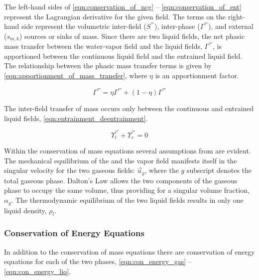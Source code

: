 The left-hand sides of \eqref{eqn:conservation_of_ncg} -- \eqref{eqn:conservation_of_ent} represent the Lagrangian derivative for the given field.
The terms on the right-hand side represent the volumetric inter-field ($S^{'''}$), inter-phase ($\Gamma^{'''}$),  and external ($s_{m,k}$) sources or sinks of mass.
Since there are two liquid fields, the net phasic mass transfer between the water-vapor field and the liquid fields, $\Gamma^{'''}$, is apportioned between the continuous liquid field and the entrained liquid field.
The relationship between the phasic mass transfer terms is given by \eqref{eqn:apportionment_of_mass_transfer}, where $\eta$ is an apportionment factor. 

\begin{equation}
\label{eqn:apportionment_of_mass_transfer}
\Gamma^{'''} = \eta \Gamma^{'''} + (1 - \eta)\Gamma^{'''}
\end{equation}

The inter-field transfer of mass occurs only between the continuous and entrained liquid fields, \eqref{eqn:entrainment_deentrainment}.

\begin{equation}
\label{eqn:entrainment_deentrainment}
\Upsilon^{'''}_l + \Upsilon^{'''}_e = 0
\end{equation}

Within the conservation of mass equations several assumptions from  are evident.
The mechanical equilibrium of the \ncg{} and the vapor field manifests itself in the singular velocity for the two gaseous fields: $\vec{u}_g$, where the $g$ subscript denotes the total gaseous phase.
Dalton's Law allows the two components of the gaseous phase to occupy the same volume, thus providing for a singular volume fraction, $\alpha_g$.
The thermodynamic equilibrium of the two liquid fields results in only one liquid density, $\rho_l$.

\subsubsection{Conservation of Energy Equations}
\label{subsubsect:energy_equations}

In addition to the conservation of mass equations there are conservation of energy equations for each of the two phases, \eqref{eqn:con_energy_gas} -- \eqref{eqn:con_energy_liq}.

